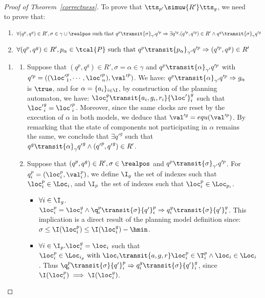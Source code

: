   \begin{proof}[Proof of Theorem~\ref{correctness}]
    To prove that $\tts_{p'}\simuw{R'} \tts_g$, we need to prove that:

  \begin{enumerate}
    \item $\forall(q^p,q^g)\in R',\sigma\in\gamma\cup\realpos\text{ such that }q^p\transit{
        \sigma}_{\gamma'}q'^{p}\Rightarrow\exists q'^g.(q'^{p},q'^g)\in R'\wedge 
      q^g\transit{\sigma}_{\gamma}q'^g$
    \item $\forall(q^p,q^g)\in R',p_{\alpha}\in\tcal{P}\text{ such that }q^p\transit{
        p_{\alpha}}_{\gamma'}q'^{p}\Rightarrow(q'^{p},q^g)\in R'$ 
  \end{enumerate}

  \begin{enumerate}
    \item
  \begin{enumerate}
    \item Suppose that $(q^p,q^g)\in R',\sigma=\alpha\in\gamma$ and $q^p\transit{\alpha}_{
        \gamma'}q'^{p}$ with $q'^p=(({\loc'}_1^p,\cdots,{\loc'}_n^p),{\val'}^p)$. We have:
      $q^p\transit{\alpha}_{\gamma'}q'^{p}\Rightarrow g_{\alpha}$ is $\true$, and for 
      $\alpha=\{a_i\}_{i\in\I}$, by construction of the planning automaton, we have:
      $\loc_i^g\transit{a_i,g_i,r_i}{\loc'}_i^g$ such that ${\loc'}_i^g={\loc'}_i^p$. Moreover, 
     since the same clocks are reset by the execution of $\alpha$ in both models, we deduce 
      that $\val'^g=equ(\val'^p)$. 
      By remarking that the state of components not participating in $\alpha$ remains the same, 
      we conclude that $\exists {q'}^g$ such that 
      $q^g\transit{\alpha}_{\gamma}{q'}^g\wedge({q'}^p,{q'}^g)\in R'$. 
    \item Suppose that $(q^p,q^g)\in R',\sigma\in\realpos$ and $q^p\transit{\sigma}_{\gamma'}
      q'^{p}$. For $q^p_i=(\loc_i^p,\val_i^p)$, we define $\I_g$ the set of indexes such that 
       $\loc_i^p\in\Loc_i$, and $\I_p$ the set of indexes such that $\loc_i^p\in\Loc_{p_i}$. 
       \begin{itemize}
         \item $\forall i\in\I_g$.$\loc_i^p=\loc_i^g\wedge\q_i^p\transit{\sigma}
           {q'}_i^p\Rightarrow q_i^g\transit{\sigma}{q'}_i^g$. This implication is a direct 
           result of the planning model definition since: $\sigma\le\I(\loc_i^p)\le\I(
           \loc_i^g)-\hmin$.
         \item $\forall i\in\I_p.\loc_i^g=\loc_i$ such that $\loc^p_i\in\Loc_{i_p}\text{ with }
           \loc_i\transit{a,g,r}\loc_i^p\in\T_i^p\wedge\loc_i\in\Loc_i$.
           Thus $\q_i^p\transit{\sigma}{q'}_i^p\Rightarrow q_i^g\transit{\sigma}{q'}_i^g$, 
           since $\I(\loc_i^p)\implies\I(\loc_i^g)$.


\end{itemize}
\end{enumerate}
\end{enumerate}
\end{proof}
